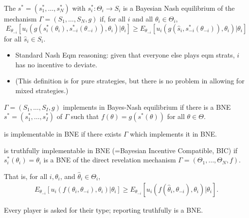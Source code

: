 \documentclass[english,handout]{beamer}		%
\def\lyxframeend{} %
\begin{document}
\begin{definition}
	The  $s^* =(s_{1}^*,\dots,s_{N}^*)$ with $s_i^*: \Theta_i \to S_i$ is a \alert{Bayesian Nash equilibrium} of the mechanism $\Gamma=(S_{1},\dots,S_{N},g)$ if, for all $i$ and all $\theta_{i}\in\Theta_{i}$,
	$$E_{\theta_{-i}}\left[u_{i}(g(s_i^*(\theta_i),s_{-i}^*(\theta_{-i})),\theta_{i})|\theta_{i}\right]\geq E_{\theta_{-i}}\left[u_{i}(g(\hat s_i,s_{-i}^*(\theta_{-i})),\theta_{i})|\theta_{i}\right]$$
	for all $\hat s_{i}\in S_{i}$.
\end{definition}
\pause
\begin{itemize}
	\item Standard Nash Eqm reasoning: given that everyone else plays eqm strats, $i$ has no incentive to deviate.
	\item (This definition is for pure strategies, but there is no problem in allowing for mixed strategies.)
\end{itemize}
\vspace{-1em}
\lyxframeend


\begin{definition}
	 $\Gamma=(S_{1},\dots,S_{I},g)$ \alert{implements  in Bayes-Nash equilibrium} if there is a BNE $s^*=(s_{1}^*,\dots,s_{I}^*)$ of $\Gamma$ such that $f(\theta)=g(s^{*}(\theta))$ for all $\theta\in \Theta$.
\end{definition}
\pause
\begin{definition}
	 is \alert{implementable in BNE} if there exists $\Gamma$ which implements it in BNE.
\end{definition}
\lyxframeend


\begin{definition}
	 is \alert{truthfully implementable in BNE} (=Bayesian Incentive Compatible, \alert{BIC}) if $s_{i}^*(\theta_{i})=\theta_{i}$ is a BNE of the direct revelation mechanism $\Gamma=(\Theta_{1},\dots,\Theta_{N},f)$. 
	\bigskip
	
	That is, for all $i,\theta_{i}$, and $\hat{\theta}_{i}\in\Theta_{i}$,
	\vspace{-0.5em}\begin{align*}
		E_{\theta_{-i}}\left[u_{i}(f(\theta_i,\theta_{-i}),\theta_{i})|\theta_{i}\right]\geq E_{\theta_{-i}}\left[u_{i}(f(\hat \theta_{i},\theta_{-i}),\theta_{i})|\theta_{i}\right].
	\end{align*}\vspace{-1em}
\end{definition}
\pause
Every player is asked for their type; reporting truthfully is a BNE.
\lyxframeend
\end{document}
